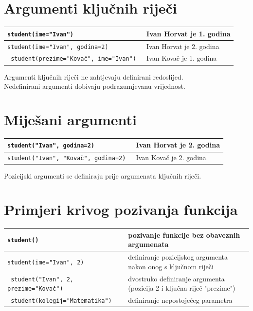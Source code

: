 \documentclass[10pt]{article}
\begin{document}
    \section*{\color{NavyBlue} Argumenti ključnih riječi}
    \begin{tabular}{|>{\tt}p{9.00cm}|>{}p{15.50cm}|}
        \hline
        student(ime="Ivan")                         & Ivan Horvat je 1. godina \\ \hline
        student(ime="Ivan", godina=2)               & Ivan Horvat je 2. godina \\ \hline
        student(prezime="Kovač", ime="Ivan")        & Ivan Kovač je 1. godina \\ \hline
    \end{tabular}
    \begin{center}
        \footnotesize
        Argumenti ključnih riječi ne zahtjevaju definirani redoslijed. \\
        Nedefinirani argumenti dobivaju podrazumjevanu vrijednost.
    \end{center}

    \section*{\color{NavyBlue} Miješani argumenti}
    \begin{tabular}{|>{\tt}p{9.00cm}|>{}p{15.50cm}|}
        \hline
        student("Ivan", godina=2)                   & Ivan Horvat je 2. godina \\ \hline
        student("Ivan", "Kovač", godina=2)          & Ivan Kovač je 2. godina \\ \hline
    \end{tabular}
    \begin{center}
        \footnotesize
        Pozicijski argumenti se definiraju prije argumenata ključnih riječi. \\
    \end{center}

    \section*{\color{NavyBlue} Primjeri krivog pozivanja funkcija}
    \begin{tabular}{|>{\tt}p{9.00cm}|>{}p{15.50cm}|}
        \hline
        student()                               & pozivanje funkcije bez obaveznih argumenata \\ \hline
        student(ime="Ivan", 2)                  & definiranje pozicijskog argumenta nakon onog s ključnom riječi \\ \hline
        student("Ivan", 2, prezime="Kovač")     & dvostruko definiranje argumenta (pozicija 2 i ključna riječ "prezime") \\ \hline
        student(kolegij="Matematika")           & definiranje nepostojećeg parametra \\ \hline
    \end{tabular}
\end{document}
